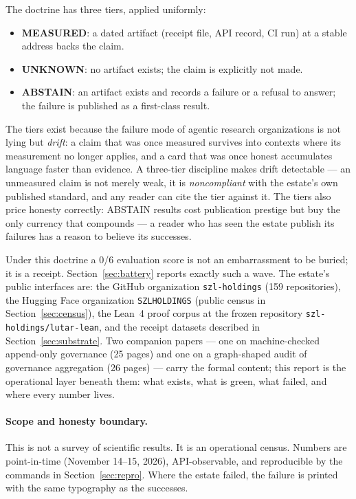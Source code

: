 ﻿\documentclass[11pt]{article}
\begin{document}
The doctrine has three tiers, applied uniformly:
\begin{itemize}
\item \textbf{MEASURED}: a dated artifact (receipt file, API record, CI run) at a stable address backs the claim.
\item \textbf{UNKNOWN}: no artifact exists; the claim is explicitly not made.
\item \textbf{ABSTAIN}: an artifact exists and records a failure or a refusal to answer; the failure is published as a first-class result.
\end{itemize}

The tiers exist because the failure mode of agentic research organizations is not lying but \emph{drift}: a claim that was once measured survives into contexts where its measurement no longer applies, and a card that was once honest accumulates language faster than evidence. A three-tier discipline makes drift detectable --- an unmeasured claim is not merely weak, it is \emph{noncompliant} with the estate's own published standard, and any reader can cite the tier against it. The tiers also price honesty correctly: ABSTAIN results cost publication prestige but buy the only currency that compounds --- a reader who has seen the estate publish its failures has a reason to believe its successes.

Under this doctrine a 0/6 evaluation score is not an embarrassment to be buried; it is a receipt. Section~\ref{sec:battery} reports exactly such a wave. The estate's public interfaces are: the GitHub organization \texttt{szl-holdings} (159 repositories), the Hugging Face organization \texttt{SZLHOLDINGS} (public census in Section~\ref{sec:census}), the Lean~4 proof corpus at the frozen repository \texttt{szl-holdings/lutar-lean}, and the receipt datasets described in Section~\ref{sec:substrate}. Two companion papers --- one on machine-checked append-only governance (25 pages) and one on a graph-shaped audit of governance aggregation (26 pages) --- carry the formal content; this report is the operational layer beneath them: what exists, what is green, what failed, and where every number lives.

\paragraph{Scope and honesty boundary.} This is not a survey of scientific results. It is an operational census. Numbers are point-in-time (November 14--15, 2026), API-observable, and reproducible by the commands in Section~\ref{sec:repro}. Where the estate failed, the failure is printed with the same typography as the successes.
\end{document}
